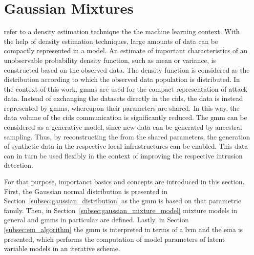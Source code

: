 \documentclass[../../../main.tex]{subfiles}
\begin{document}
\section{Gaussian Mixtures}

 refer to a density estimation technique the the machine learning context. With the help of density estimation techniques, large amounts of data can be compactly represented in a model. An estimate of important characteristics of an unobservable probability density function, such as mean or variance, is constructed based on the observed data. The density function is considered as the distribution according to which the observed data population is distributed. In the context of this work, \glspl{gmm} are used for the compact representation of attack data. Instead of exchanging the datasets directly in the \gls{cids}, the data is instead represented by gmms, whereupon their parameters are shared. In this way, the data volume of the \gls{cids} communication is significantly reduced. The \gls{gmm} can be considered as a generative model, since new data can be generated by ancestral sampling. Thus, by reconstructing the  from the shared parameters, the generation of synthetic data in the respective local infrastructures can be enabled. This data can in turn be used flexibly in the context of improving the respective intrusion detection.

For that purpose, importanct basics and concepts are introduced in this section. First, the Gaussian normal distribution is presented in Section~\ref{subsec:gaussian_distribution} as the \gls{gmm} is based on that parametric family. Then, in Section~\ref{subsec:gaussian_mixture_model} mixture models in general and \glspl{gmm} in particular are defined. Lastly, in Section \ref{subsec:em_algorithm} the \acrshort{gmm} is interpreted in terms of a \gls{lvm} and the \gls{ema} is presented, which performs the computation of model parameters of latent variable models in an iterative scheme.






\end{document}
